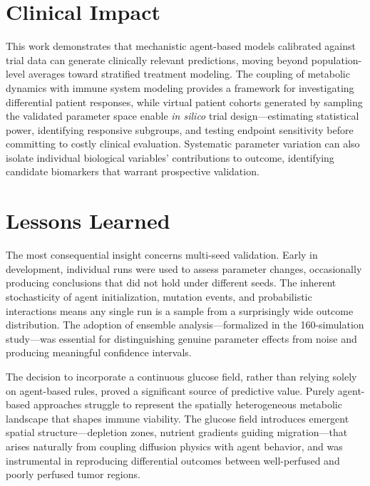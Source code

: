 \section{Clinical Impact}
\label{sec:clinical-impact}

This work demonstrates that mechanistic agent-based models calibrated against trial data can generate clinically relevant predictions, moving beyond population-level averages toward stratified treatment modeling. The coupling of metabolic dynamics with immune system modeling provides a framework for investigating differential patient responses, while virtual patient cohorts generated by sampling the validated parameter space enable \emph{in silico} trial design---estimating statistical power, identifying responsive subgroups, and testing endpoint sensitivity before committing to costly clinical evaluation. Systematic parameter variation can also isolate individual biological variables' contributions to outcome, identifying candidate biomarkers that warrant prospective validation.

\section{Lessons Learned}
\label{sec:lessons-learned}

The most consequential insight concerns multi-seed validation. Early in development, individual runs were used to assess parameter changes, occasionally producing conclusions that did not hold under different seeds. The inherent stochasticity of agent initialization, mutation events, and probabilistic interactions means any single run is a sample from a surprisingly wide outcome distribution. The adoption of ensemble analysis---formalized in the 160-simulation study---was essential for distinguishing genuine parameter effects from noise and producing meaningful confidence intervals.

The decision to incorporate a continuous glucose field, rather than relying solely on agent-based rules, proved a significant source of predictive value. Purely agent-based approaches struggle to represent the spatially heterogeneous metabolic landscape that shapes immune viability. The glucose field introduces emergent spatial structure---depletion zones, nutrient gradients guiding migration---that arises naturally from coupling diffusion physics with agent behavior, and was instrumental in reproducing differential outcomes between well-perfused and poorly perfused tumor regions.

